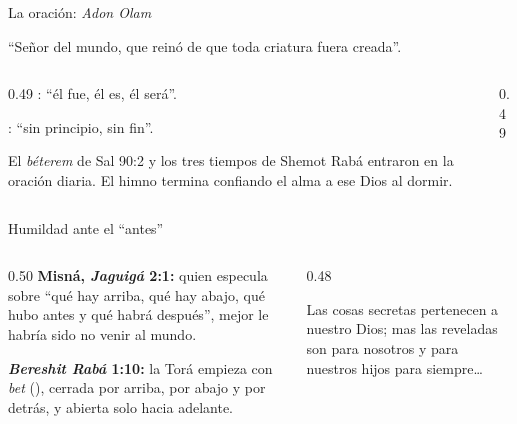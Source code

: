 \begin{frame}{La oración: \emph{Adon Olam}}
\begin{center}\large{}\end{center}
\small ``Señor del mundo, que reinó  de que toda criatura fuera creada''.\par\medskip
\begin{columns}[t,onlytextwidth]
\begin{column}{0.49\textwidth}\scriptsize
{}: ``él fue, él es, él será''.\par
{}: ``sin principio, sin fin''.\par\smallskip
El \emph{béterem} de Sal 90:2 y los tres tiempos de Shemot Rabá entraron en la oración diaria. El himno termina confiando el alma a ese Dios al dormir.
\end{column}
\begin{column}{0.49\textwidth}
\end{column}
\end{columns}
\end{frame}

\begin{frame}{Humildad ante el ``antes''}
\begin{columns}[t,onlytextwidth]
\begin{column}{0.50\textwidth}\small
\textbf{Misná, \emph{Jaguigá} 2:1:} quien especula sobre ``qué hay arriba, qué hay abajo, qué hubo antes y qué habrá después'', mejor le habría sido no venir al mundo.\par\medskip
\textbf{\emph{Bereshit Rabá} 1:10:} la Torá empieza con \emph{bet} (), cerrada por arriba, por abajo y por detrás, y abierta solo hacia adelante.
\end{column}
\begin{column}{0.48\textwidth}
\begin{cita}Las cosas secretas pertenecen a \SENOR{} nuestro Dios; mas las reveladas son para nosotros y para nuestros hijos para siempre\ldots{}\end{cita}
\end{column}
\end{columns}
\end{frame}

